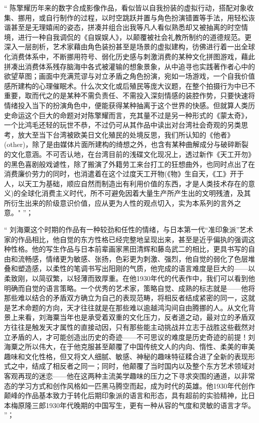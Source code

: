 \documentclass[master,oneside]{zjuthesis}
\begin{document}
“ 陈擎耀历年来的数字合成影像作品，看似皆以自我扮装的虚拟行动，搭配对象收集、挪用，或自行制作的过程，以时空跳跃并置与角色扮演错置等手法，用轻松诙谐甚至是无理嬉闹的姿态，拼凑并组合出我等凡人看似熟悉却又被抽离的时空情境，进行一种自我调侃的《自娱娱人》，以颠覆被社会礼教所制约的道德规范。更深入一层剖析，艺术家藉由角色装扮甚至是场景的虚拟建构，彷佛进行着一出全球化消费体系中，不断挪用符号、弱化历史感与刺激消费的某种文化拼图游戏，藉此拼凑出消费体系残存脑海中各式被灌输的想象景象，从中追寻也实践著作者心中的欲望草图；画面中充满荒谬与对立矛盾之角色扮演，宛如一场游戏，一个自我价值感所建构的心理催眠术。什么次文化或后殖民等庞大议题，在整个拍摄行为中已不重要，取而代之的是某种不需负责任、不需投入深刻情感的装腔作势，只要快速将情绪投入当下的扮演角色中，便能获得某种抽离于这个世界的快感。但就算人类历史命运这个巨大的命题对对陈擎耀而言，充其量不过是另一种形式的《蒙太奇》，一个比鸿毛还轻的玩世不恭，不过仍可从其作品中读出对台湾社会奇观的另类思考，放大至当下台湾被欧美日文化殖民的处境反思，我们所认知的《他者》(other)，除了是由媒体片面所建构的绮想之外，也含有某种曲解成分与破碎断裂的文化意涵。不可否认地，在台湾目前的浅碟文化现况上，透过新作《天工开勿》的黑色喜剧般戏谑性，除了搬演了外籍劳工来台打工的狂想曲外，也同时点出了在消费廉价劳力的同时，也消遣着在这个过度天工开物(《物》生自天，《工》开于人，以天工为基础，顺应自然而制造出有利用价值的东西，才是人类技术存在的意义)的全球化消费主义时代，所不可避免因着大量生产所产生出的文明残渣，及其所衍生出来的阶级意识价值，应从更为人性的观点切入，实为本系列的言外之意。" ”；

“ 刘海粟这个时期的作品有一种较劲和任性的情绪，与日本第一代“准印象派”艺术家的作品相比，他自觉的东方性格已经完整地呈现出来，甚至是近乎偏执的强调这种性格。他的写生作品与日本前辈画家黑田清辉和藤岛武二的相比，更具书写的自由和流畅感，情绪更为敏感、张扬，色彩更为刺激、强烈，他自觉的弱化了色层堆叠和塑造感，以柔性的笔调书写出阳刚的气质，他完成的语言难度是巨大的——以柔致刚，以简驭繁，以轻薄而致厚重。在他1930年代的代表作中，我们可以看到他明确而自觉的语言策略。一个优秀的艺术家，策略自觉、成熟的标志就是——他将那些难以结合的矛盾双方确立为自己的表现范畴，将相反者结成紧密的同一，这就是艺术命题的方向，天才往往就是在那些难以逾越鸿沟间自由腾挪的人。从文化背景上来看，刘海粟当年也是承受着双重的文化压力，反者道之动，最对立的矛盾双方往往是触发天才属性的直接动因，只有那些能主动挑战并立志于战胜这些截然对立矛盾的人，才可能创造出历史的奇迹——不可思议的难度是历史奇迹的前提！刘海粟之所以伟大，在于他克服甚至颠覆了中国传统文人的内向、惰性、柔美的审美趣味和文化性格，但又将文人细腻、敏感、神秘的趣味特征糅合进了全新的表现形式之中，结成了相反者之同一；同时，他颠覆了当时国内以及整个东方艺术领域对客观再现的迷恋——他在这两种主流美学趣味的压力之下寻求突围的通道，以非常态的学习方式和创作风格如一匹黑马腾空而起，成为时代的英雄。他1930年代创作颠峰的作品基本致力于转化后期印象派的语言和形态，具有超前的实验精神，比日本梅原隆三郎1930年代晚期的中国写生，更有一种从容的气度和灵敏的语言才华。 ”；
\end{document}
